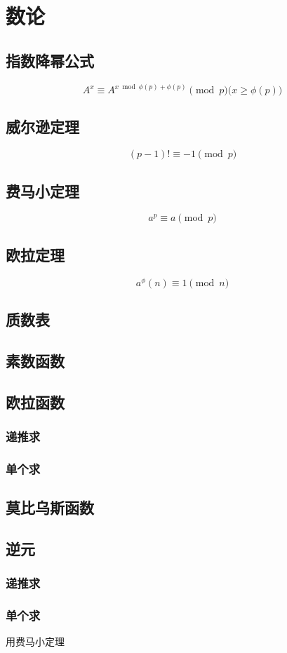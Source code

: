 \documentclass[main.tex]{subfiles}
\begin{document}
\chapter{数论}
	\section{指数降幂公式}
		$$A^x \equiv A^{x \bmod {\phi(p)} + \phi(p)} \pmod{p} (x  \geq{\phi(p))}$$
	\section{威尔逊定理}
		$$(p-1)! \equiv -1 \pmod{p} $$
	\section{费马小定理}
		$$ a^p \equiv a \pmod{p} $$
	\section{欧拉定理}
		$$ a^\phi(n) \equiv 1 \pmod{n} $$
    \section{质数表}
            
    \section{素数函数}
            
    \section{欧拉函数}
    		\subsection{递推求}	
           
         \subsection{单个求}
         		
     \section{莫比乌斯函数}
            
    \section{逆元}
    		\subsection{递推求}
    			
    		\subsection{单个求}
    			用费马小定理
\end{document}
